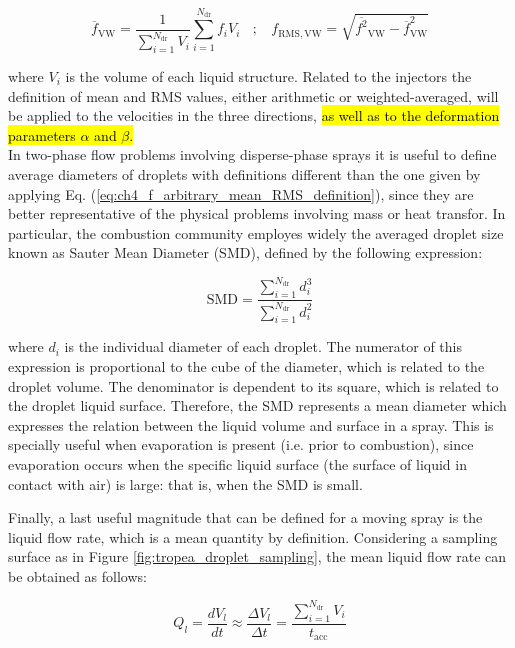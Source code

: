 \begin{equation}
\label{eq:ch4_f_arbitrary_mean_RMS_VW_definition}
\displaystyle \overline{f}_\mathrm{VW} = \frac{1}{\sum_{i=1}^{N_\mathrm{dr}} V_i} \sum_{i=1}^{N_\mathrm{dr}} f_i V_i ~~~~ ; ~~~~ f_\mathrm{RMS,VW} = \sqrt{\displaystyle \overline{f^2 }_\mathrm{VW} - \displaystyle \overline{f }_\mathrm{VW}^2}
\end{equation}

where $V_i$ is the volume of each liquid structure. Related to the injectors the definition of mean and RMS values, either arithmetic or weighted-averaged, will be applied to the velocities in the three directions, \hl{as well as to the deformation parameters $\alpha$ and $\beta$.} \\

In two-phase flow problems involving disperse-phase sprays it is useful to define average diameters of droplets with definitions different than the one given by applying Eq. (\ref{eq:ch4_f_arbitrary_mean_RMS_definition}), since they are better representative of the physical problems involving mass or heat transfor. In particular, the combustion community employes widely the averaged droplet size known as Sauter Mean Diameter (SMD), defined by the following expression:

\begin{equation}
\label{eq:ch4_SMD_definition}
\mathrm{SMD} = \frac{\sum_{i=1}^{N_\mathrm{dr}} d_i^3 }{\sum_{i=1}^{N_\mathrm{dr}} d_i^2}
\end{equation} 

where $d_i$ is the individual diameter of each droplet. The numerator of this expression is proportional to the cube of the diameter, which is related to the droplet volume. The denominator is dependent to its square, which is related to the droplet liquid surface. Therefore, the SMD represents a mean diameter which expresses the relation between the liquid volume and surface in a spray. This is specially useful when evaporation is present (i.e. prior to combustion), since evaporation occurs when the specific liquid surface (the surface of liquid in contact with air) is large: that is, when the SMD is small.

Finally, a last useful magnitude that can be defined for a moving spray is the liquid flow rate, which is a mean quantity by definition. Considering a sampling surface as in Figure \ref{fig:tropea_droplet_sampling}, the mean liquid flow rate can be obtained as follows:

\begin{equation}
\label{eq:ch4_Ql_definition}
Q_l = \frac{d V_l}{dt} \approx \frac{\Delta V_l}{\Delta t} = \frac{\sum_{i=1}^{N_\mathrm{dr}} V_i}{t_\mathrm{acc}} 
\end{equation}

